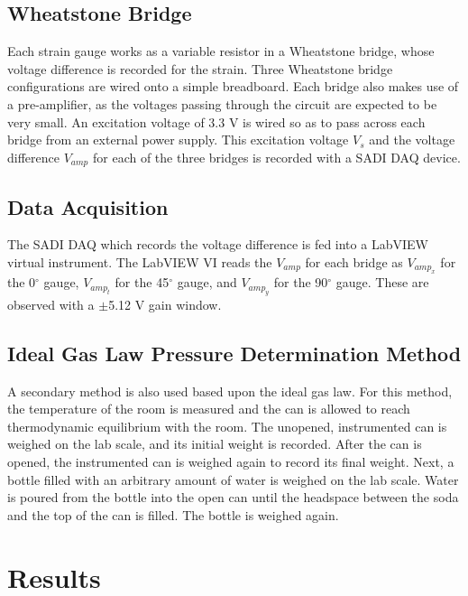 \documentclass[10pt,journal,letterpaper]{IEEEtran}
\begin{document}
\subsection{Wheatstone Bridge}

Each strain gauge works as a variable resistor in a Wheatstone bridge, whose voltage difference is recorded for the strain.
Three Wheatstone bridge configurations are wired onto a simple breadboard.
Each bridge also makes use of a pre-amplifier, as the voltages passing through the circuit are expected to be very small.
An excitation voltage of 3.3 V is wired so as to pass across each bridge from an external power supply.
This excitation voltage $V_s$ and the voltage difference $V_{amp}$ for each of the three bridges is recorded with a SADI DAQ device.

\subsection{Data Acquisition}

The SADI DAQ which records the voltage difference is fed into a LabVIEW virtual instrument.
The LabVIEW VI reads the $V_{amp}$ for each bridge as $V_{amp_{x}}$ for the 0$^\circ$ gauge, $V_{amp_{t}}$  for the 45$^\circ$ gauge, and $V_{amp_{y}}$ for the 90$^\circ$ gauge.
These are observed with a $\pm$5.12 V gain window.

\subsection{Ideal Gas Law Pressure Determination Method}

A secondary method is also used based upon the ideal gas law.
For this method, the temperature of the room is measured and the can is allowed to reach thermodynamic equilibrium with the room.
The unopened, instrumented can is weighed on the lab scale, and its initial weight is recorded.
After the can is opened, the instrumented can is weighed again to record its final weight.
Next, a bottle filled with an arbitrary amount of water is weighed on the lab scale.
Water is poured from the bottle into the open can until the headspace between the soda and the top of the can is filled.
The bottle is weighed again.

\section{Results}

\lipsum[9-10]
\end{document}
